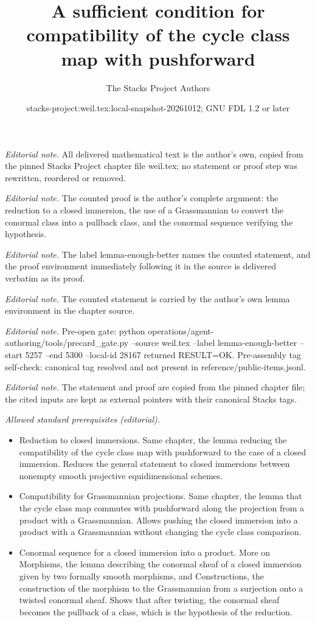 \documentclass[10pt,a4paper]{amsart}
\title{A sufficient condition for compatibility of the cycle class map with pushforward}
\author{The Stacks Project Authors}
\date{stacks-project:weil.tex:local-snapshot-20261012; GNU FDL 1.2 or later}
\theoremstyle{plain}
\theoremstyle{definition}
\theoremstyle{remark}
\numberwithin{equation}{subsection}
\begin{document}
\maketitle
\noindent\textit{Editorial note.} All delivered mathematical text is the author's own, copied from the pinned Stacks Project chapter file weil.tex; no statement or proof step was rewritten, reordered or removed.\par\medskip
\noindent\textit{Editorial note.} The counted proof is the author's complete argument: the reduction to a closed immersion, the use of a Grassmannian to convert the conormal class into a pullback class, and the conormal sequence verifying the hypothesis.\par\medskip
\noindent\textit{Editorial note.} The label lemma-enough-better names the counted statement, and the proof environment immediately following it in the source is delivered verbatim as its proof.\par\medskip
\noindent\textit{Editorial note.} The counted statement is carried by the author's own lemma environment in the chapter source.\par\medskip
\noindent\textit{Editorial note.} Pre-open gate: python operations/agent-authoring/tools/precard\_gate.py --source weil.tex --label lemma-enough-better --start 5257 --end 5300 --local-id 28167 returned RESULT=OK. Pre-assembly tag self-check: canonical tag resolved and not present in reference/public-items.jsonl.\par\medskip
\noindent\textit{Editorial note.} The statement and proof are copied from the pinned chapter file; the cited inputs are kept as external pointers with their canonical Stacks tags.\par\medskip
\noindent\textit{Allowed standard prerequisites (editorial).}\begin{itemize}
\item Reduction to closed immersions. Same chapter, the lemma reducing the compatibility of the cycle class map with pushforward to the case of a closed immersion. Reduces the general statement to closed immersions between nonempty smooth projective equidimensional schemes.
\item Compatibility for Grassmannian projections. Same chapter, the lemma that the cycle class map commutes with pushforward along the projection from a product with a Grassmannian. Allows pushing the closed immersion into a product with a Grassmannian without changing the cycle class comparison.
\item Conormal sequence for a closed immersion into a product. More on Morphisms, the lemma describing the conormal sheaf of a closed immersion given by two formally smooth morphisms, and Constructions, the construction of the morphism to the Grassmannian from a surjection onto a twisted conormal sheaf. Shows that after twisting, the conormal sheaf becomes the pullback of a class, which is the hypothesis of the reduction.
\end{itemize}\medskip
\end{document}
